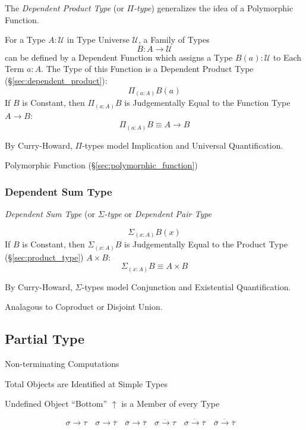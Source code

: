 The \emph{Dependent Product Type} (or \emph{$\Pi$-type}) generalizes
the idea of a Polymorphic Function.

For a Type $A : \mathcal{U}$ in Type Universe $\mathcal{U}$, a Family
of Types
\[
  B : A \rightarrow \mathcal{U}
\]
can be defined by a Dependent Function which assigns a Type $B(a) :
\mathcal{U}$ to Each Term $a : A$. The Type of this Function is a
Dependent Product Type (\S\ref{sec:dependent_product}):
\[
  \Pi_{(a:A)}B(a)
\]
If $B$ is Constant, then $\Pi_(a:A)B$ is Judgementally Equal to the
Function Type $A \rightarrow B$:
\[
  \Pi_{(a:A)}B \equiv A \rightarrow B
\]

By Curry-Howard, $\Pi$-types model Implication and Universal
Quantification.

Polymorphic Function (\S\ref{sec:polymorphic_function})



\subsubsection{Dependent Sum Type}\label{sec:dependent_sum}

\emph{Dependent Sum Type} (or \emph{$\Sigma$-type} or \emph{Dependent
  Pair Type}

\[
  \Sigma_{(x:A)} B(x)
\]
If $B$ is Constant, then $\Sigma_{(x:A)}B$ is Judgementally Equal to
the Product Type (\S\ref{sec:product_type}) $A \times B$:
\[
  \Sigma_{(x:A)} B \equiv A \times B
\]

By Curry-Howard, $\Sigma$-types model Conjunction and Existential
Quantification.

Analagous to Coproduct or Disjoint Union.



\subsection{Partial Type}\label{sec:partial_type}
\cite{thompson99}

Non-terminating Computations

Total Objects are Identified at Simple Types

Undefined Object ``Bottom'' $\uparrow$ is a Member of every Type

\[
  \sigma \rightarrow \tau \quad
  \sigma \rightarrow \overline{\tau} \quad
  \overline{\sigma} \rightarrow \overline{\tau} \quad
  \overline{\sigma \rightarrow \tau} \quad
  \overline{\sigma \rightarrow \overline{\tau}} \quad
  \overline{\overline{\sigma} \rightarrow \overline{\tau}} \quad
\]




